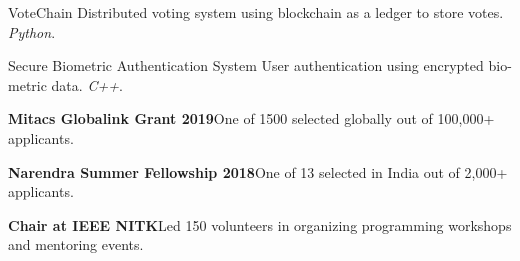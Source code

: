 \documentclass[11pt,a4paper]{article}
\begin{document}
\headedsectiontwo
{VoteChain}{}{}
{
	Distributed voting system using blockchain as a ledger to store votes. \textit{Python}.
}

\headedsectiontwo
{Secure Biometric Authentication System}{}{}
{
	User authentication using encrypted bio-metric data. \textit{C++}.
}


\begin{circlist}
	\item \textbf{Mitacs Globalink Grant 2019}\hspace{0.5em}One of 1500 selected globally out of 100,000+ applicants.
	\item \textbf{Narendra Summer Fellowship 2018}\hspace{0.5em}One of 13 selected in India out of 2,000+ applicants.
	\item \textbf{Chair at IEEE NITK}\hspace{0.5em}Led 150 volunteers in organizing programming workshops and mentoring events.
\end{circlist}

\end{document}
